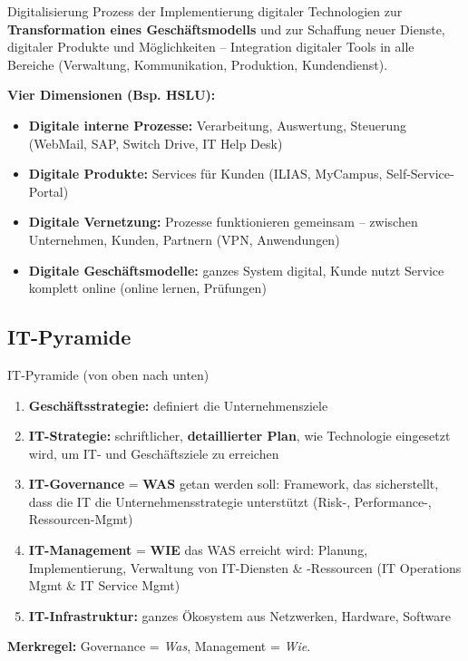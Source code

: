 \documentclass[a4paper, fontsize=7pt]{scrartcl}
\begin{document}
\begin{mainbox}{Digitalisierung}
Prozess der Implementierung digitaler Technologien zur
\textbf{Transformation eines Geschäftsmodells} und zur Schaffung neuer
Dienste, digitaler Produkte und Möglichkeiten -- Integration digitaler Tools in
alle Bereiche (Verwaltung, Kommunikation, Produktion, Kundendienst).

\textbf{Vier Dimensionen (Bsp. HSLU):}
\begin{itemize}
    \item \textbf{Digitale interne Prozesse:} Verarbeitung, Auswertung,
          Steuerung (WebMail, SAP, Switch Drive, IT Help Desk)
    \item \textbf{Digitale Produkte:} Services für Kunden (ILIAS, MyCampus,
          Self-Service-Portal)
    \item \textbf{Digitale Vernetzung:} Prozesse funktionieren gemeinsam --
          zwischen Unternehmen, Kunden, Partnern (VPN, Anwendungen)
    \item \textbf{Digitale Geschäftsmodelle:} ganzes System digital, Kunde
          nutzt Service komplett online (online lernen, Prüfungen)
\end{itemize}
\end{mainbox}

\subsection{IT-Pyramide}

\begin{mainbox}{IT-Pyramide (von oben nach unten)}
\begin{enumerate}
    \item \textbf{Geschäftsstrategie:} definiert die Unternehmensziele
    \item \textbf{IT-Strategie:} schriftlicher, \textbf{detaillierter Plan},
          wie Technologie eingesetzt wird, um IT- und Geschäftsziele zu
          erreichen
    \item \textbf{IT-Governance} = \textbf{WAS} getan werden soll: Framework,
          das sicherstellt, dass die IT die Unternehmensstrategie unterstützt
          (Risk-, Performance-, Ressourcen-Mgmt)
    \item \textbf{IT-Management} = \textbf{WIE} das WAS erreicht wird:
          Planung, Implementierung, Verwaltung von IT-Diensten \& -Ressourcen
          (IT Operations Mgmt \& IT Service Mgmt)
    \item \textbf{IT-Infrastruktur:} ganzes Ökosystem aus Netzwerken,
          Hardware, Software
\end{enumerate}
\textbf{Merkregel:} Governance = \emph{Was}, Management = \emph{Wie}.
\end{mainbox}
\end{document}
